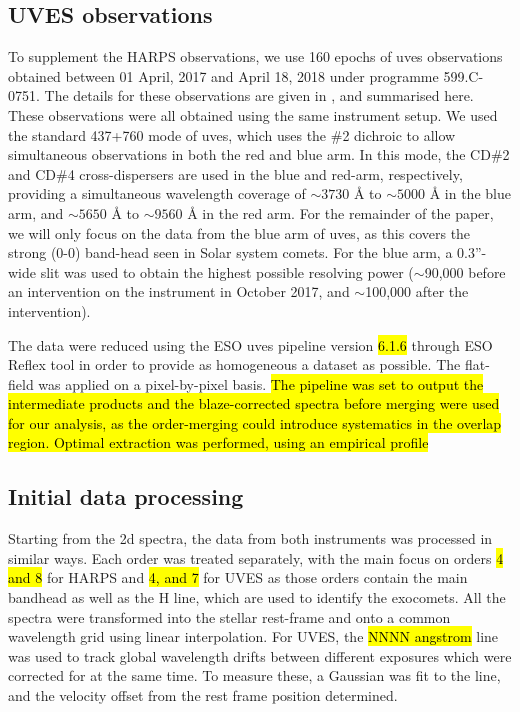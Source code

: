 \documentclass{aa}
\begin{document}



\subsection{UVES observations}

To supplement the HARPS observations, we use 160 epochs of \ac{uves} observations obtained between 01 April, 2017 and April 18, 2018 under programme 599.C-0751.
%
The details for these observations are given in \cite{vansluijs2019}, and summarised here.
%
These observations were all obtained using the same instrument setup.
%
We used the standard 437+760 mode of \ac{uves}, which uses the \#2 dichroic to allow simultaneous observations in both the red and blue arm.
%
In this mode, the CD\#2 and CD\#4 cross-dispersers are used in the blue and red-arm, respectively, providing a simultaneous wavelength coverage of $\sim 3730$ \AA{} to $\sim 5000$ \AA{} in the blue arm, and $\sim 5650$ \AA{} to $\sim 9560$ \AA{} in the red arm.
%
For the remainder of the paper, we will only focus on the data from the blue arm of \ac{uves}, as this covers the strong  (0-0) band-head seen in Solar system comets.
%
For the blue arm, a 0.3''-wide slit was used to obtain the highest possible resolving power ($\sim$90,000 before an intervention on the instrument in October 2017, and $\sim$100,000 after the intervention). 

The data were reduced using the ESO \ac{uves} pipeline version \hl{6.1.6} through ESO Reflex tool in order to provide as homogeneous a dataset as possible. The flat-field was applied on a pixel-by-pixel basis. \hl{The pipeline was set to output the intermediate products and the blaze-corrected spectra before merging were used for our analysis, as the order-merging could introduce systematics in the overlap region. Optimal extraction was performed, using an empirical profile}

\subsection{Initial data processing}
Starting from the 2d spectra, the data from both instruments was processed in similar ways.
%
Each order was treated separately, with the main focus on orders \hl{4 and 8} for HARPS and \hl{4, and 7} for UVES as those orders contain the main  bandhead as well as the  H line, which are used to identify the exocomets.
%
All the spectra were transformed into the stellar rest-frame and onto a common wavelength grid using linear interpolation. For UVES, the  \hl{NNNN angstrom} line was used to track global wavelength drifts between different exposures which were corrected for at the same time. To measure these, a Gaussian was fit to the line, and the velocity offset from the rest frame position determined. 
\end{document}
